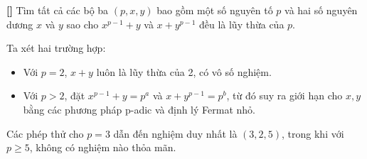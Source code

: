 \documentclass[../05-modular-arithmetic-a.tex]{subfiles}
\begin{document}
\begin{example*}\label{example:IND-2015-TST4-P3}\textbf{[]}
	Tìm tất cả các bộ ba \( (p, x, y) \) bao gồm một số nguyên tố \( p \) và hai số nguyên dương \( x \) và \( y \)
	sao cho \( x^{p-1} + y \) và \( x + y^{p-1} \) đều là lũy thừa của \( p \).
\end{example*}

\begin{story*}
    Ta xét hai trường hợp:  
    \begin{itemize}[topsep=0pt, partopsep=0pt, itemsep=0pt]
        \item Với \( p = 2 \), \( x + y \) luôn là lũy thừa của 2, có vô số nghiệm.
        \item Với \( p > 2 \), đặt \( x^{p-1} + y = p^a \) và \( x + y^{p-1} = p^b \), từ đó suy ra giới hạn cho \( x, y \) bằng các phương pháp p-adic và định lý Fermat nhỏ.
    \end{itemize}
    Các phép thử cho \( p = 3 \) dẫn đến nghiệm duy nhất là \( (3, 2, 5) \), trong khi với \( p \ge 5 \), không có nghiệm nào thỏa mãn.
\end{story*}

\bigbreak
\end{document}
